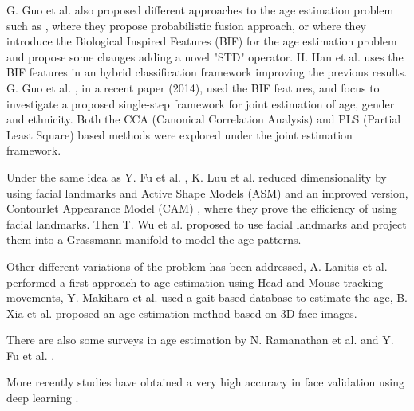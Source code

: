 G. Guo et al. also proposed different approaches to the age estimation problem such as
\cite{4563041}, where they propose probabilistic fusion approach, or \cite{conf/cvpr/GuoMFH09} where they introduce the Biological Inspired Features (BIF) for the age estimation problem and propose some changes adding a novel "STD" operator. H. Han et al. \cite{han:age} uses the BIF features in an hybrid classification framework improving the previous results. G. Guo et al. \cite{Guo2014761}, in a recent paper (2014), used the BIF features, and focus to investigate a proposed single-step framework for joint estimation of age, gender and ethnicity. Both the CCA (Canonical Correlation Analysis) and PLS (Partial Least Square) based methods were explored under the joint estimation framework.

Under the same idea as Y. Fu et al. \cite{4284917}, K. Luu et al. \cite{Luu:2009:AEU:1736406.1736456, LuuSSBS11} reduced dimensionality by using facial landmarks and Active Shape Models (ASM) \cite{Luu:2009:AEU:1736406.1736456} and an improved version, Contourlet Appearance Model (CAM) \cite{LuuSSBS11}, where they prove the efficiency of using facial landmarks. Then T. Wu et al. \cite{journals/tifs/WuTC12} proposed to use facial landmarks and project them into a Grassmann manifold to model the age patterns.

Other different variations of the problem has been addressed, A. Lanitis et al. \cite{5463396} performed a first approach to age estimation using Head and Mouse tracking movements, Y. Makihara et al. \cite{6117531} used a gait-based database to estimate the age, B. Xia et al. \cite{xia:hal-00904007} proposed an age estimation method based on 3D face images.

There are also some surveys in age estimation by N. Ramanathan et al. \cite{Ramanathan2009131} and Y. Fu et al. \cite{5406526}.

More recently studies have obtained a very high accuracy in face validation using deep learning \cite{taigman2014deepface}.

